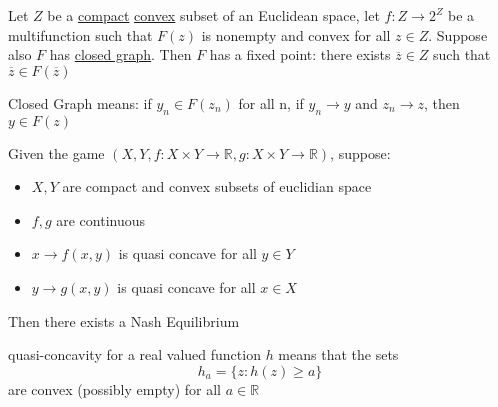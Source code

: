 \documentclass[../main.tex]{subfiles}
\begin{document}
\begin{theorem}
    Let $Z$ be a \underline{compact} \underline{convex} subset of an Euclidean space, let $f: Z \to 2^Z$ be a multifunction such that $F(z)$ is nonempty and convex for all $z \in Z$. Suppose also $F$ has \underline{closed graph}. Then $F$ has a fixed point: there exists $\overline{z} \in Z$ such that $\overline{z} \in F(\overline{z})$
\end{theorem}

Closed Graph means: if $y_n \in F(z_n)$ for all n, if $y_n \to y$ and $z_n \to z$, then $y \in F(z)$

\begin{theorem}
    Given the game $(X,Y, f: X \times Y \to \mathbb{R}, g: X \times Y \to \mathbb{R})$, suppose:
    \begin{itemize}
        \item $X,Y$ are compact and convex subsets of euclidian space
        \item $f,g$ are continuous
        \item $x \to f(x,y)$ is quasi concave for all $y \in Y$
        \item $y \to g(x,y)$ is quasi concave for all $x \in X$
    \end{itemize}
    Then there exists a Nash Equilibrium
\end{theorem}
quasi-concavity for a real valued function $h$ means that the sets
\[
    h_a = \{z: h(z) \geq a\}
\]
are convex (possibly empty) for all $a \in \mathbb{R}$
\end{document}
